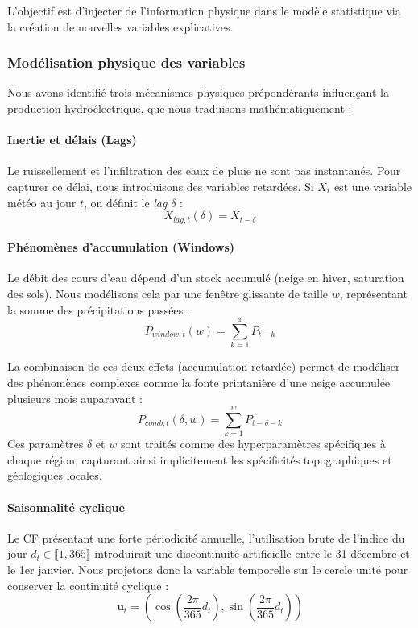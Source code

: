 \documentclass{article}
\theoremstyle{nopointbreak}
\theoremstyle{nobrkbold}
\begin{document}
L'objectif est d'injecter de l'information physique dans le modèle statistique via la création de nouvelles variables explicatives.

\subsubsection{Modélisation physique des variables}

Nous avons identifié trois mécanismes physiques prépondérants influençant la production hydroélectrique, que nous traduisons mathématiquement :

\paragraph{Inertie et délais (Lags)}
Le ruissellement et l'infiltration des eaux de pluie ne sont pas instantanés. Pour capturer ce délai, nous introduisons des variables retardées. Si $X_t$ est une variable météo au jour $t$, on définit le \textit{lag} $\delta$ :
\[ X_{lag, t}(\delta) = X_{t-\delta} \]

\paragraph{Phénomènes d'accumulation (Windows)}
Le débit des cours d'eau dépend d'un stock accumulé (neige en hiver, saturation des sols). Nous modélisons cela par une fenêtre glissante de taille $w$, représentant la somme des précipitations passées :
\[ P_{window, t}(w) = \sum_{k=1}^{w} P_{t-k} \]

La combinaison de ces deux effets (accumulation retardée) permet de modéliser des phénomènes complexes comme la fonte printanière d'une neige accumulée plusieurs mois auparavant :
\[ P_{comb, t}(\delta, w) = \sum_{k=1}^{w} P_{t-\delta-k} \]
Ces paramètres $\delta$ et $w$ sont traités comme des hyperparamètres spécifiques à chaque région, capturant ainsi implicitement les spécificités topographiques et géologiques locales.

\paragraph{Saisonnalité cyclique}
Le CF présentant une forte périodicité annuelle, l'utilisation brute de l'indice du jour $d_t \in \llbracket 1, 365 \rrbracket$ introduirait une discontinuité artificielle entre le 31 décembre et le 1er janvier. Nous projetons donc la variable temporelle sur le cercle unité pour conserver la continuité cyclique :
\[ \mathbf{u}_t = \left( \cos\left(\frac{2\pi}{365} d_t\right) , \sin\left(\frac{2\pi}{365} d_t\right) \right) \]
\end{document}
